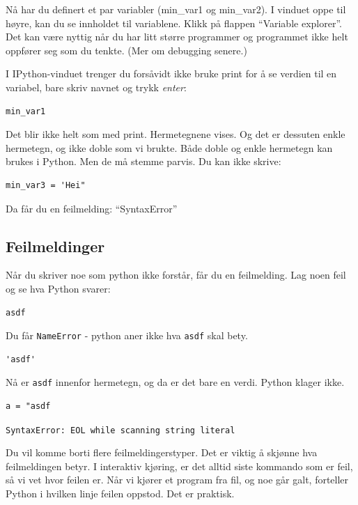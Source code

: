 Nå har du definert et par variabler (min\_{}var1 og min\_{}var2). I vinduet oppe til høyre, kan du se innholdet til variablene. Klikk på flappen ``Variable explorer''. Det kan være nyttig når du har litt større programmer og programmet ikke helt oppfører seg som du tenkte. (Mer om debugging senere.) 

I IPython-vinduet trenger du forsåvidt ikke bruke print for å se verdien til en variabel, bare skriv navnet og trykk {\em enter}:
\begin{lstlisting}
min_var1
\end{lstlisting}

Det blir ikke helt som med print. Hermetegnene vises. Og det er dessuten enkle hermetegn, og ikke doble som vi brukte. Både doble og enkle hermetegn kan brukes i Python. Men de må stemme parvis. Du kan ikke skrive:

\begin{lstlisting}
min_var3 = 'Hei"
\end{lstlisting}

Da får du en feilmelding: ``SyntaxError''

\subsection{Feilmeldinger}

Når du skriver noe som python ikke forstår, får du en feilmelding.  Lag noen feil og se hva Python svarer:


\begin{lstlisting}
asdf
\end{lstlisting}

Du får \texttt{NameError} - python aner ikke hva \texttt{asdf} skal bety.

\begin{lstlisting}
'asdf'
\end{lstlisting}

Nå er \texttt{asdf} innenfor hermetegn, og da er det bare en verdi. Python klager ikke.

\begin{lstlisting}
a = "asdf
\end{lstlisting}

\texttt{SyntaxError: EOL while scanning string literal}

Du vil komme borti flere feilmeldingerstyper. Det er viktig å skjønne hva feilmeldingen betyr. I interaktiv kjøring, er det alltid siste kommando som er feil, så vi vet hvor feilen er. Når vi kjører et program fra fil, og noe går galt, forteller Python i hvilken linje
feilen oppstod. Det er praktisk. 


